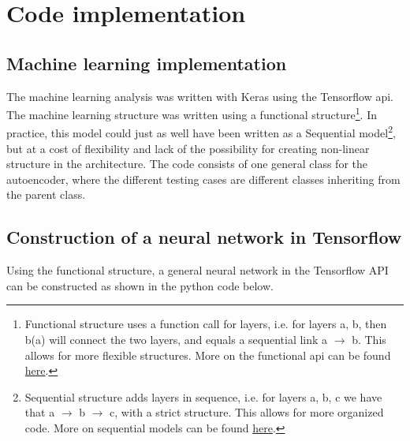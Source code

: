 \section{Code implementation}
\subsection*{Machine learning implementation}

The machine learning analysis was written with Keras\cite{chollet2015keras} using the Tensorflow api\cite{tensorflow-whitepaper}. 
The machine learning structure was written using a functional structure\footnote{Functional structure uses a function call for layers, i.e. for layers a, b, then b(a) will connect the two layers, and equals a sequential link a $\to$ b. This allows for more flexible structures. More on the functional api can be found \href{https://www.tensorflow.org/guide/keras/functional}{here}.}.
In practice, this model could just as well have been written as a Sequential model\footnote{Sequential structure adds layers in sequence, i.e. for layers a, b, c we have that a $\to$ b $\to$ c, with a strict structure. This allows for more organized code. More on sequential models can be found \href{https://www.tensorflow.org/guide/keras/sequential_model}{here}.}, 
but at a cost of flexibility and lack of the possibility for creating non-linear structure in the architecture. The code consists of one general class for
 the autoencoder, where the different testing cases are different classes inheriting from the parent class.
\subsection*{Construction of a neural network in Tensorflow}

Using the functional structure, a general neural network in the Tensorflow API can be constructed as shown in the python code below. 

